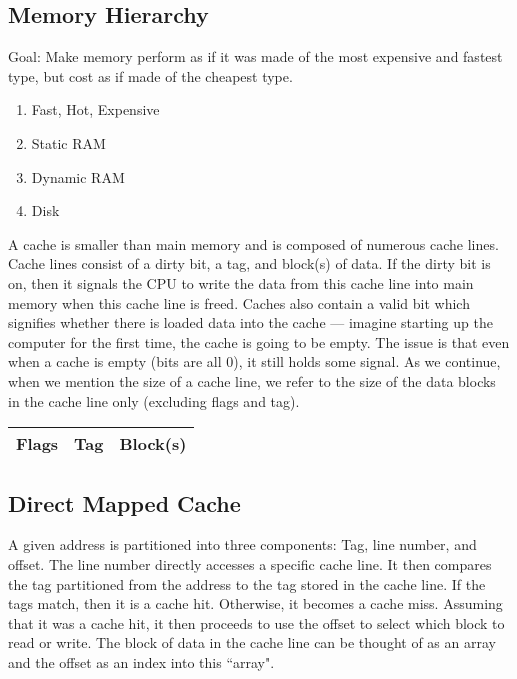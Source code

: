 \documentclass[11pt]{article}
\begin{document}
\subsection{Memory Hierarchy}

Goal: Make memory perform as if it was made of the most expensive and fastest type, but cost as if made of the cheapest type.

\begin{enumerate}
	\item Fast, Hot, Expensive
	\item Static RAM
	\item Dynamic RAM
	\item Disk
\end{enumerate}

\noindent A cache is smaller than main memory and is composed of numerous cache lines. Cache lines consist of a dirty bit, a tag, and block(s) of data. If the dirty bit is on, then it signals the CPU to write the data from this cache line into main memory when this cache line is freed. Caches also contain a valid bit which signifies whether there is loaded data into the cache --- imagine starting up the computer for the first time, the cache is going to be empty. The issue is that even when a cache is empty (bits are all 0), it still holds some signal. As we continue, when we mention the size of a cache line, we refer to the size of the data blocks in the cache line only (excluding flags and tag).

\begin{table}[H]
	\centering
	\begin{tabular}{| c | c | c |}
		\hline
		Flags	&	\hspace{.5cm} Tag \hspace{.5cm} 		&	\hspace{1cm} Block(s) \hspace{1cm} \\
		\hline
	\end{tabular}
\end{table}

\subsection{Direct Mapped Cache}

A given address is partitioned into three components: Tag, line number, and offset. The line number directly accesses a specific cache line. It then compares the tag partitioned from the address to the tag stored in the cache line. If the tags match, then it is a cache hit. Otherwise, it becomes a cache miss. Assuming that it was a cache hit, it then proceeds to use the offset to select which block to read or write. The block of data in the cache line can be thought of as an array and the offset as an index into this ``array".
\end{document}
